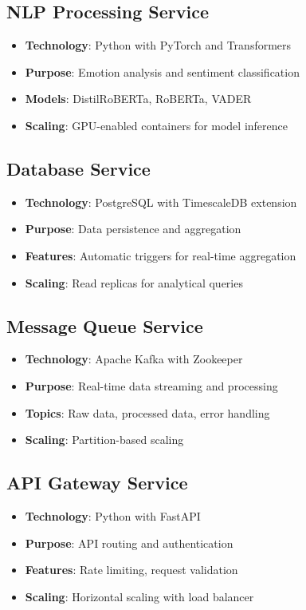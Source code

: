 \subsection{NLP Processing Service}
\begin{itemize}
\item \textbf{Technology}: Python with PyTorch and Transformers
\item \textbf{Purpose}: Emotion analysis and sentiment classification
\item \textbf{Models}: DistilRoBERTa, RoBERTa, VADER
\item \textbf{Scaling}: GPU-enabled containers for model inference
\end{itemize}

\subsection{Database Service}
\begin{itemize}
\item \textbf{Technology}: PostgreSQL with TimescaleDB extension
\item \textbf{Purpose}: Data persistence and aggregation
\item \textbf{Features}: Automatic triggers for real-time aggregation
\item \textbf{Scaling}: Read replicas for analytical queries
\end{itemize}

\subsection{Message Queue Service}
\begin{itemize}
\item \textbf{Technology}: Apache Kafka with Zookeeper
\item \textbf{Purpose}: Real-time data streaming and processing
\item \textbf{Topics}: Raw data, processed data, error handling
\item \textbf{Scaling}: Partition-based scaling
\end{itemize}

\subsection{API Gateway Service}
\begin{itemize}
\item \textbf{Technology}: Python with FastAPI
\item \textbf{Purpose}: API routing and authentication
\item \textbf{Features}: Rate limiting, request validation
\item \textbf{Scaling}: Horizontal scaling with load balancer
\end{itemize}

